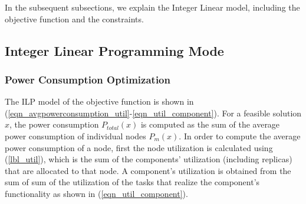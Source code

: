 
In the subsequent subsections, we explain the Integer Linear model, including the objective function and the constraints.

\subsection{Integer Linear Programming Mode}
\subsubsection{Power Consumption Optimization }
The ILP model of the objective function is shown in (\ref{eqn_avgpowerconsumption_util}-\ref{eqn_util_component}). For a feasible solution $x$, the power consumption $P_{total}(x)$ is computed as the sum of the average power consumption of individual nodes $P_m(x)$. In order to compute the average power consumption of a node, first the node utilization is calculated using (\ref{lbl_util}), which is the sum of the components' utilization (including replicas) that are allocated to that node. A component's utilization is obtained from the sum of sum of the utilization of the tasks that realize the component's functionality as shown in (\ref{eqn_util_component}).

